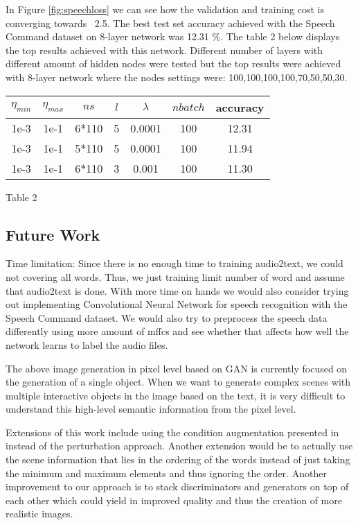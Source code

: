 \documentclass[../main.tex]{subfiles}
\begin{document}
In Figure \ref{fig:speechloss} we can see how the validation and training cost is converging towards ~2.5. The best test set accuracy achieved with the Speech Command dataset on 8-layer network was 12.31 \%. The table 2 below displays the top results achieved with this network. Different number of layers with different amount of hidden nodes were tested but the top results were achieved with 8-layer network where the nodes settings were: 100,100,100,100,70,50,50,30.

\begin{center}
 \begin{tabular}{|c c c c c c c|} 
 \hline
 $\eta_{min}$ & $\eta_{max}$ & $ns$  & $l$ & $\lambda$ & $nbatch$ & accuracy\\ [0.5ex] 
 \hline\hline
 1e-3 & 1e-1 & 6*110 & 5 & 0.0001 & 100 & 12.31 \\ 
 \hline
 1e-3 & 1e-1 & 5*110 & 5 & 0.0001 & 100 & 11.94 \\
 \hline
 1e-3 & 1e-1 & 6*110 & 3 & 0.001 & 100 & 11.30 \\[1ex]
\hline
\end{tabular}
\caption{Table 2}
\end{center}

\subsection{Future Work}
Time limitation: Since there is no enough time to training audio2text, we could not covering all words. Thus, we just training limit number of word and assume that audio2text is done. With more time on hands we would also consider trying out implementing Convolutional Neural Network for speech recognition with the Speech Command dataset. We would also try to preprocess the speech data differently using more amount of mffcs and see whether that affects how well the network learns to label the audio files.
\par
The above image generation in pixel level based on GAN is currently focused on the generation of a single object. When we want to generate complex scenes with multiple interactive objects in the image based on the text, it is very difficult to understand this high-level semantic information from the pixel level.

Extensions of this work include using the condition augmentation presented in \cite{zhang2017stackgan++} instead of the perturbation approach. Another extension would be to actually use the scene information that lies in the ordering of the words instead of just taking the minimum and maximum elements and thus ignoring the order. Another improvement to our approach is to stack discriminators and generators on top of each other \cite{zhang2017stackgan++} which could yield in improved quality and thus the creation of more realistic images. 
\end{document}
